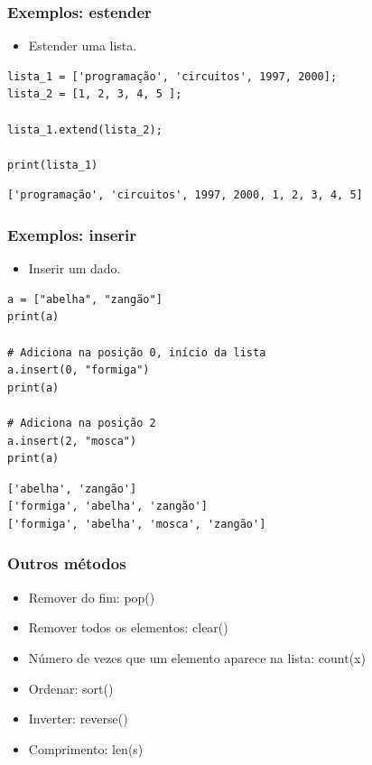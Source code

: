 \documentclass{beamer}
\begin{document}
\begin{frame}[fragile]
\frametitle{Exemplos: estender}

\begin{itemize}
    \vfill \item Estender uma lista.
\end{itemize}

\vfill \begin{verbatim}
lista_1 = ['programação', 'circuitos', 1997, 2000];
lista_2 = [1, 2, 3, 4, 5 ];

lista_1.extend(lista_2);

print(lista_1)
\end{verbatim}
    

\vfill \begin{verbatim}
['programação', 'circuitos', 1997, 2000, 1, 2, 3, 4, 5]
\end{verbatim}

\end{frame}



\begin{frame}[fragile]
\frametitle{Exemplos: inserir}

\begin{itemize}
    \vfill \item Inserir um dado.
\end{itemize}

\vfill \begin{verbatim}
a = ["abelha", "zangão"]
print(a)

# Adiciona na posição 0, início da lista
a.insert(0, "formiga")
print(a)

# Adiciona na posição 2
a.insert(2, "mosca")
print(a)
\end{verbatim}
    

\vfill \begin{verbatim}
['abelha', 'zangão']
['formiga', 'abelha', 'zangão']
['formiga', 'abelha', 'mosca', 'zangão']
\end{verbatim}

\end{frame}


\begin{frame}
 \frametitle{Outros métodos}
 
 \begin{itemize}
    \vfill \item Remover do fim: pop()
    \vfill \item Remover todos os elementos: clear()
    \vfill \item Número de vezes que um elemento aparece na lista: count(x)
    \vfill \item Ordenar: sort()
    \vfill \item Inverter: reverse()
    \vfill \item Comprimento: len(s)
 \end{itemize}
\end{frame}
\end{document}
